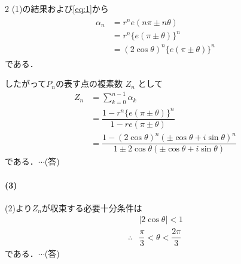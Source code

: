 \documentclass[../../main.tex]{subfiles}
\begin{document}
\begin{multicols}{2}
  (1)の結果および\cref{eq:1}から
  \begin{align}
    \begin{aligned}
      \alpha_n
      & = r^n e(n\pi \pm n\theta)                 \\
      & = r^n \{e(\pi \pm \theta)\}^n             \\
      & = (2\cos\theta)^n \{e(\pi \pm \theta)\}^n
    \end{aligned}
  \end{align}
  である．

  したがって$P_n$の表す点の複素数 $Z_n$ として
  \begin{align}
    Z_n
    & = \sum_{k=0}^{n-1} \alpha_k                                                                              \\
    & = \dfrac{1 - r^n \{e(\pi\pm \theta)\}^n}{1 - r e(\pi\pm \theta)}                                          \\
    & = \dfrac{1 - (2\cos\theta)^n (\pm\cos\theta+i\sin\theta)^n}{1 \pm 2\cos\theta(\pm\cos\theta+i\sin\theta)}
  \end{align}
  である．$\cdots$(答)

  \paragraph{(3)}
  (2)より$Z_n$が収束する必要十分条件は
  \begin{align}
    & |2\cos\theta| < 1                       \\
    \therefore
    & \dfrac{\pi}{3} < \theta < \dfrac{2\pi}{3}
  \end{align}
  である．$\cdots$(答)


\end{multicols}
\end{document}
